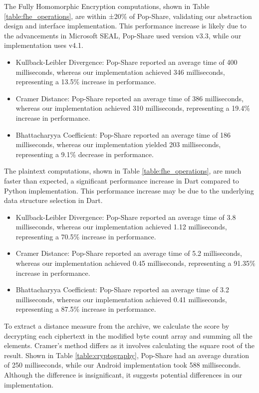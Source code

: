 

The Fully Homomorphic Encryption computations, shown in Table \ref{table:fhe_operations}, are within ±20\% of Pop-Share, validating our abstraction design and interface implementation. This performance increase is likely due to the advancements in Microsoft SEAL, Pop-Share used version v3.3, while our implementation uses v4.1.

\begin{itemize}
    \item Kullback-Leibler Divergence: Pop-Share reported an average time of 400 milliseconds, whereas our implementation achieved 346 milliseconds, representing a 13.5\% increase in performance.
    \item Cramer Distance: Pop-Share reported an average time of 386 milliseconds, whereas our implementation achieved 310 milliseconds, representing a 19.4\% increase in performance.
    \item Bhattacharyya Coefficient: Pop-Share reported an average time of 186 milliseconds, whereas our implementation yielded 203 milliseconds, representing a 9.1\% decrease in performance.
\end{itemize}



The plaintext computations, shown in Table \ref{table:fhe_operations}, are much faster than expected, a significant performance increase in Dart compared to Python implementation. This performance increase may be due to the underlying data structure selection in Dart.

\begin{itemize}
    \item Kullback-Leibler Divergence: Pop-Share reported an average time of 3.8 milliseconds, whereas our implementation achieved 1.12 milliseconds, representing a 70.5\% increase in performance.
    \item Cramer Distance: Pop-Share reported an average time of 5.2 milliseconds, whereas our implementation achieved 0.45 milliseconds, representing a 91.35\% increase in performance.
    \item Bhattacharyya Coefficient: Pop-Share reported an average time of 3.2 milliseconds, whereas our implementation achieved 0.41 milliseconds, representing a 87.5\% increase in performance.
\end{itemize}

To extract a distance measure from the archive, we calculate the score by decrypting each ciphertext in the modified byte count array and summing all the elements. Cramer's method differs as it involves calculating the square root of the result. Shown in Table \ref{table:cryptography}, Pop-Share had an average duration of 250 milliseconds, while our Android implementation took 588 milliseconds. Although the difference is insignificant, it suggests potential differences in our implementation.

